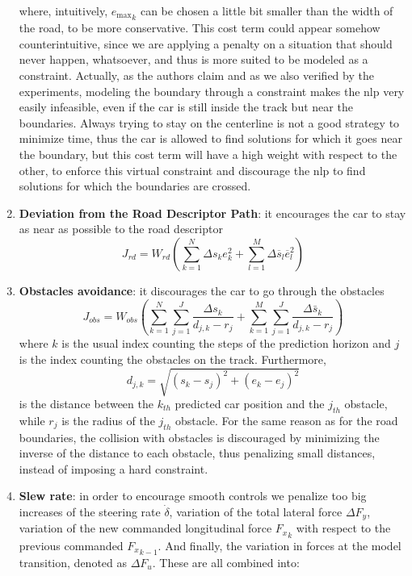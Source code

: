 \documentclass[a4paper, onecolumn, 12pt]{article}
\begin{document}
\begin{enumerate}
    where, intuitively, ${e_{\text{max}}}_k$ can be chosen a little bit smaller
    than the width of the road, to be more conservative. This cost term could
    appear somehow counterintuitive, since we are applying a penalty on a
    situation that should never happen, whatsoever, and thus is more suited to
    be modeled as a constraint. Actually, as the authors claim and as we also
    verified by the experiments, modeling the boundary through a constraint
    makes the nlp very easily infeasible, even if the car is still inside the
    track but near the boundaries. Always trying to stay on the centerline is
    not a good strategy to minimize time, thus the car is allowed to find
    solutions for which it goes near the boundary, but this cost term will have
    a high weight with respect to the other, to enforce this virtual constraint
    and discourage the nlp to find solutions for which the boundaries are
    crossed.

    \item \textbf{Deviation from the Road Descriptor Path}: it encourages the car to stay as near as possible to the road descriptor
    \begin{equation}
    J_{rd} = W_{rd} \left( \sum_{k=1}^{N} \Delta s_k e_k^2 + \sum_{l=1}^{M} \Delta\overline{s}_l \overline{e}_l^2 \right)
    \end{equation}

    \item \textbf{Obstacles avoidance}: it discourages the car to go through the obstacles
    \begin{equation}
        J_{obs} = W_{obs} \left( \sum_{k=1}^{N} \sum_{j=1}^{J} \frac{\Delta s_k}{d_{j,k} - r_j} + \sum_{k=1}^{M} \sum_{j=1}^{J} \frac{\Delta \bar{s}_k}{d_{j,k} - r_j} \right)
    \end{equation}
    where $k$ is the usual index counting the steps of the prediction horizon
    and $j$ is the index counting the obstacles on the track. Furthermore,
    \[d_{j,k} = \sqrt{(s_k-s_j)^2 + (e_k-e_j)^2}\] is the distance between the
    $k_{th}$ predicted car position and the $j_{th}$ obstacle, while $r_j$ is
    the radius of the $j_{th}$ obstacle. For the same reason as for the road
    boundaries, the collision with obstacles is discouraged by minimizing the
    inverse of the distance to each obstacle, thus penalizing small distances,
    instead of imposing a hard constraint.

    \item \textbf{Slew rate}: in order to encourage smooth controls we penalize too big increases of the steering rate $\dot{\delta}$, variation of the total lateral force $\Delta F_y$, variation of the new commanded longitudinal force ${F_x}_k$ with respect to the previous commanded ${F_x}_{k-1}$.
    And finally, the variation in forces at the model transition, denoted as $\Delta F_u$.
    These are all combined into:
    

\end{enumerate}
\end{document}
